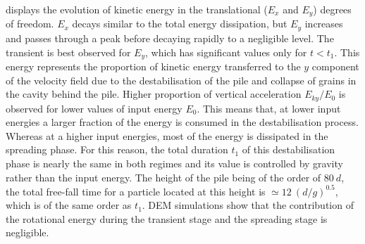 \documentclass[3p,times,procedia,number]{elsarticle}
\begin{document}
 displays the evolution of kinetic energy 
in the translational ($E_x$ and $E_y$) degrees of freedom. $E_x$ decays similar 
to the total energy dissipation, but $E_y$ increases and passes through a peak 
before decaying rapidly to a negligible level. The transient is best 
observed for $E_y$, which has significant values only for $t< t_1$. This energy 
represents the proportion of kinetic energy transferred to the $y$ component of 
the velocity field  due to the destabilisation of the pile and collapse of 
grains in the cavity behind the pile. Higher proportion of vertical 
acceleration $E_{ky}/E_0$ is observed for lower values of input energy $E_0$. 
This means that, at lower input energies a larger fraction of the energy is 
consumed in the destabilisation process. Whereas at a higher input energies, 
most of the energy is dissipated in the spreading phase. For this reason, the 
total duration $t_1$ of this destabilisation phase is nearly the same in 
both regimes and its value is controlled by gravity rather than the input 
energy. The height of the pile being of the order of $80 \ d$, the total 
free-fall time for a particle located at this height is $\simeq 12 \ 
(d/g)^{0.5}$, which is of the same order as $t_1$. DEM simulations show that 
the contribution of the rotational energy during the transient stage and the 
spreading stage is negligible. 
\end{document}
